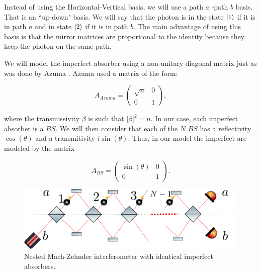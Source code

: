\documentclass[12pt]{book}
\begin{document}
 
Instead of using the Horizontal-Vertical basis, we will use a path $a$ -path $b$ basis. That is an ``up-down" basis. We will say that the photon is in the state $\ket{1}$ if it is in path $a$ and in state $\ket{2}$ if it is in path $b$. The main advantage of using this basis is that the mirror matrices are proportional to the identity because they keep the photon on the same path.
 

 
 
  We will model the imperfect absorber using a non-unitary diagonal matrix just as was done by  Azuma \cite{Azuma}. Azuma used a matrix of the form:
 
 \begin{equation}
 A_{Azuma}=\begin{pmatrix} \sqrt{n} & 0\\0& 1\end{pmatrix},
\label{absorber}
 \end{equation}
 
 where the transmissivity $\beta$  is such that $|\beta|^{2}=n$. In our case, each imperfect absorber is a $BS$. We will then consider that each of the $N$ $BS$ has a reflectivity $\cos(\theta)$ and a transmitivity $i\sin(\theta)$. Thus, in our model the imperfect are modeled by the matrix
 

\begin{equation}
 A_{BS}=\begin{pmatrix} \sin(\theta) & 0\\0& 1\end{pmatrix}.
\label{absorber1}
\end{equation}

\begin{figure}[t!]
\centering
\includegraphics[width=\linewidth]{images/nmach2.png}
\caption{Nested Mach-Zehnder interferometer  with identical imperfect absorbers.}
\label{Nmach}
\end{figure}
\end{document}

